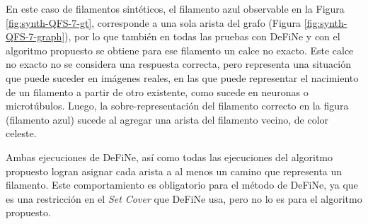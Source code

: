 En este caso de filamentos sint\'eticos, el filamento azul observable en la Figura \ref{fig:synth-QFS-7-gt}, corresponde a una sola arista del grafo (Figura \ref{fig:synth-QFS-7-graph}), por lo que tambi\'en en todas las pruebas con DeFiNe y con el algoritmo propuesto se obtiene para ese filamento un calce no exacto. Este calce no exacto no se considera una respuesta correcta, pero representa una situaci\'on que puede suceder en im\'agenes reales, en las que puede representar el nacimiento de un filamento a partir de otro existente, como sucede en neuronas o microt\'ubulos. 
Luego, la sobre-representaci\'on del filamento correcto en la figura (filamento azul) sucede al agregar una arista del filamento vecino, de color celeste.


Ambas ejecuciones de DeFiNe, as\'i como todas las ejecuciones del algoritmo propuesto logran asignar cada arista a al menos un camino que representa un filamento. Este comportamiento es obligatorio para el m\'etodo de DeFiNe, ya que es una restricci\'on en el {\it Set Cover} que DeFiNe usa, pero no lo es para el algoritmo propuesto.




